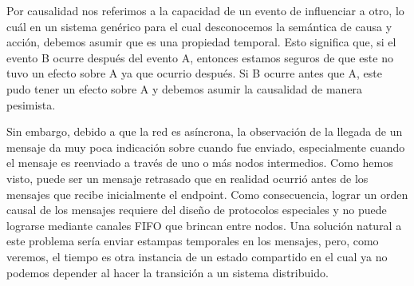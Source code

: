 \documentclass[12pt]{article}
\begin{document}
Por causalidad nos referimos a la capacidad de un evento de influenciar a otro, 
lo cuál  en un sistema genérico para el cual desconocemos la semántica de causa y acción, 
debemos asumir que es una propiedad temporal.
Esto significa que, 
si el evento B ocurre después del evento A,
entonces estamos seguros de que este no tuvo un efecto sobre A ya que ocurrio después.
Si B ocurre antes que A,
este pudo tener un efecto sobre A y debemos asumir la causalidad de manera pesimista. 

Sin embargo,
debido a que la red es asíncrona, 
la observación de la llegada de un mensaje da muy poca indicación
sobre cuando fue enviado,
especialmente cuando el mensaje es reenviado a través de uno o más nodos intermedios.
Como hemos visto, puede ser un mensaje retrasado que en realidad ocurrió antes de los mensajes que recibe inicialmente el endpoint.
Como consecuencia,
lograr un orden causal de los mensajes requiere del diseño de protocolos especiales y no puede lograrse mediante canales FIFO que brincan entre nodos. Una solución natural a este problema sería enviar estampas temporales en los mensajes, pero,
como veremos, 
el tiempo es otra instancia de un estado compartido en el cual ya no podemos depender al hacer la transición a un sistema distribuido.
\end{document}
